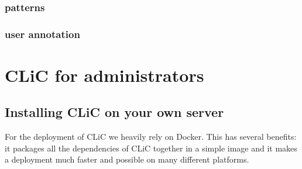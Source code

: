 \documentclass[letterpaper,10pt,english]{sphinxmanual}
\begin{document}
\subsection{patterns}
\label{endusers:patterns}

\subsection{user annotation}
\label{endusers:user-annotation}

\chapter{CLiC for administrators}
\label{admin::doc}\label{admin:clic-for-administrators}

\section{Installing CLiC on your own server}
\label{admin:installing-clic-on-your-own-server}
For the deployment of CLiC we heavily rely on Docker. This has several benefits:
it packages all the dependencies of CLiC together in a simple image and it makes
a deployment much faster and possible on many different platforms.
\end{document}
